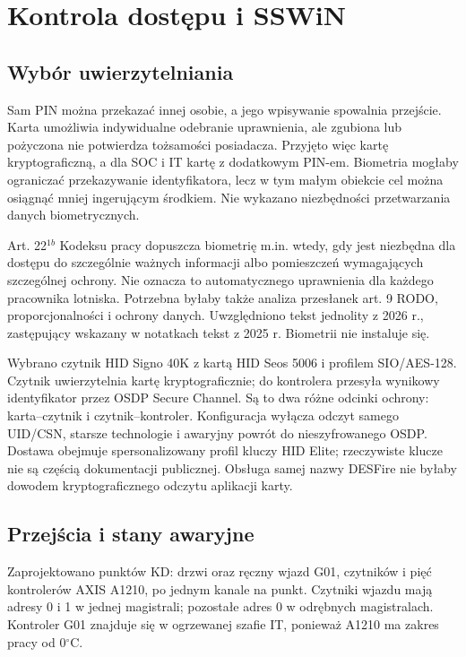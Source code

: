 \section{Kontrola dostępu i SSWiN}
\subsection{Wybór uwierzytelniania}
Sam PIN można przekazać innej osobie, a jego wpisywanie spowalnia przejście. Karta umożliwia indywidualne odebranie uprawnienia, ale zgubiona lub pożyczona nie potwierdza tożsamości posiadacza. Przyjęto więc kartę kryptograficzną, a dla SOC i IT kartę z dodatkowym PIN-em. Biometria mogłaby ograniczać przekazywanie identyfikatora, lecz w tym małym obiekcie cel można osiągnąć mniej ingerującym środkiem. Nie wykazano niezbędności przetwarzania danych biometrycznych.

Art. 22$^{1b}$ Kodeksu pracy dopuszcza biometrię m.in. wtedy, gdy jest niezbędna dla dostępu do szczególnie ważnych informacji albo pomieszczeń wymagających szczególnej ochrony. Nie oznacza to automatycznego uprawnienia dla każdego pracownika lotniska. Potrzebna byłaby także analiza przesłanek art. 9 RODO, proporcjonalności i ochrony danych. Uwzględniono tekst jednolity z 2026 r., zastępujący wskazany w notatkach tekst z 2025 r. Biometrii nie instaluje się.\cite{L-KP,L-GDPR}

Wybrano czytnik HID Signo 40K z kartą HID Seos 5006 i profilem SIO/AES-128. Czytnik uwierzytelnia kartę kryptograficznie; do kontrolera przesyła wynikowy identyfikator przez OSDP Secure Channel. Są to dwa różne odcinki ochrony: karta--czytnik i czytnik--kontroler. Konfiguracja wyłącza odczyt samego UID/CSN, starsze technologie i awaryjny powrót do nieszyfrowanego OSDP. Dostawa obejmuje spersonalizowany profil kluczy HID Elite; rzeczywiste klucze nie są częścią dokumentacji publicznej. Obsługa samej nazwy DESFire nie byłaby dowodem kryptograficznego odczytu aplikacji karty.\cite{S-READER,S-CARD,S-KD}

\subsection{Przejścia i stany awaryjne}
Zaprojektowano \AccessCount{} punktów KD: \DoorCount{} drzwi oraz ręczny wjazd G01, \ReaderCount{} czytników i pięć kontrolerów AXIS A1210, po jednym kanale na punkt. Czytniki wjazdu mają adresy 0 i 1 w jednej magistrali; pozostałe adres 0 w odrębnych magistralach. Kontroler G01 znajduje się w ogrzewanej szafie IT, ponieważ A1210 ma zakres pracy od 0$^\circ$C.\cite{S-KD}

